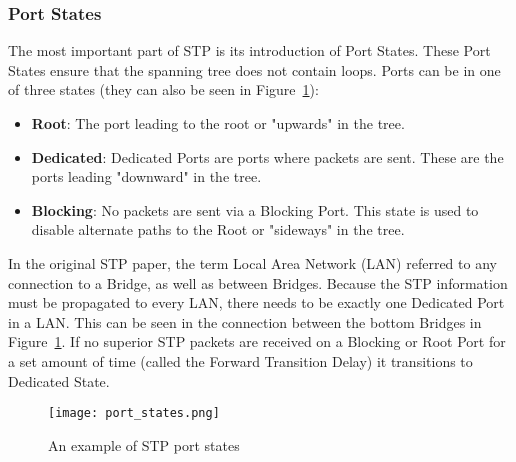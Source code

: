 \subsubsection{Port States}
The most important part of STP is its introduction of Port States.
These Port States ensure that the spanning tree does not contain loops.
Ports can be in one of three states (they can also be seen in Figure~\ref{fig:port_states}):
\begin{itemize}
    \item \textbf{Root}: The port leading to the root or "upwards" in the tree.
    \item \textbf{Dedicated}: Dedicated Ports are ports where packets are sent. These are the ports leading "downward" in the tree.
    \item \textbf{Blocking}: No packets are sent via a Blocking Port.
        This state is used to disable alternate paths to the Root or "sideways" in the tree.
\end{itemize}
In the original STP paper, the term Local Area Network (LAN) referred to any connection to a Bridge, as well as between Bridges.
Because the STP information must be propagated to every LAN, there needs to be exactly one Dedicated Port in a LAN.
This can be seen in the connection between the bottom Bridges in Figure~\ref{fig:port_states}.
If no superior STP packets are received on a Blocking or Root Port for a set amount of time (called the Forward Transition Delay) it transitions to Dedicated State.
\begin{figure}[h]
    \centering
    \texttt{[image: port\_states.png]}
    \caption{An example of STP port states}
    \label{fig:port_states}
\end{figure}

